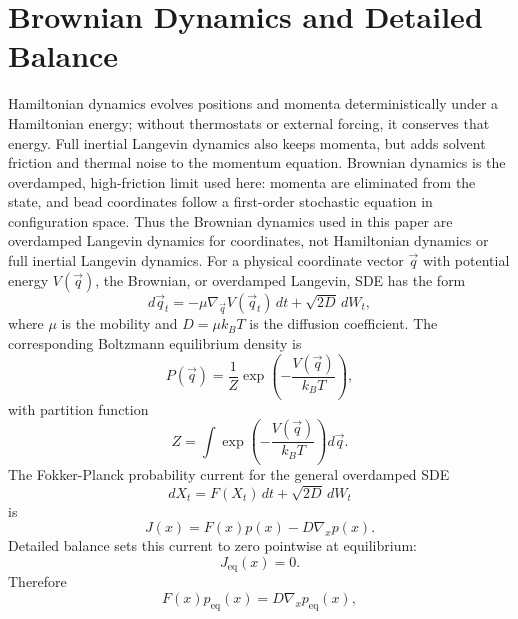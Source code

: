 \documentclass[reprint,amsmath,amssymb,aps,pra,10pt]{revtex4-2}
\begin{document}
\section{Brownian Dynamics and Detailed Balance}

Hamiltonian dynamics evolves positions and momenta deterministically under a Hamiltonian energy; without thermostats or external forcing, it conserves that energy.
Full inertial Langevin dynamics also keeps momenta, but adds solvent friction and thermal noise to the momentum equation.
Brownian dynamics is the overdamped, high-friction limit used here: momenta are eliminated from the state, and bead coordinates follow a first-order stochastic equation in configuration space.
Thus the Brownian dynamics used in this paper are overdamped Langevin dynamics for coordinates, not Hamiltonian dynamics or full inertial Langevin dynamics.
For a physical coordinate vector $\vec{q}$ with potential energy $V(\vec{q})$, the Brownian, or overdamped Langevin, SDE has the form
\begin{equation}
    d\vec{q}_t
    =
    -\mu
    \nabla_{\vec{q}}V(\vec{q}_t)\,dt
    +
    \sqrt{2D}\,dW_t,
\end{equation}
where $\mu$ is the mobility and $D=\mu k_B T$ is the diffusion coefficient.
The corresponding Boltzmann equilibrium density is
\begin{equation}
    P(\vec{q})
    =
    \frac{1}{Z}
    \exp
    \left(
        -\frac{V(\vec{q})}{k_B T}
    \right),
\end{equation}
with partition function
\begin{equation}
    Z
    =
    \int
    \exp
    \left(
        -\frac{V(\vec{q})}{k_B T}
    \right)
    d\vec{q}.
\end{equation}
The Fokker-Planck probability current for the general overdamped SDE
\begin{equation}
    dX_t
    =
    F(X_t)\,dt
    +
    \sqrt{2D}\,dW_t
\end{equation}
is
\begin{equation}
    J(x)
    =
    F(x)p(x)
    -
    D\nabla_x p(x).
\end{equation}
Detailed balance sets this current to zero pointwise at equilibrium:
\begin{equation}
    J_{\mathrm{eq}}(x)=0.
\end{equation}
Therefore
\begin{equation}
    F(x)p_{\mathrm{eq}}(x)
    =
    D\nabla_x p_{\mathrm{eq}}(x),
\end{equation}
\end{document}
